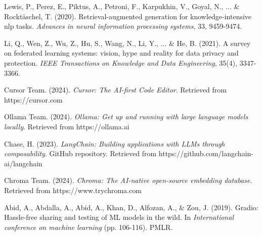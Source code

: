\documentclass[12pt,letterpaper]{article}
\begin{document}
\begin{thebibliography}{99}

Lewis, P., Perez, E., Piktus, A., Petroni, F., Karpukhin, V., Goyal, N., ... \& Rockt\"{a}schel, T. (2020). Retrieval-augmented generation for knowledge-intensive nlp tasks. \textit{Advances in neural information processing systems}, 33, 9459-9474.

Li, Q., Wen, Z., Wu, Z., Hu, S., Wang, N., Li, Y., ... \& He, B. (2021). A survey on federated learning systems: vision, hype and reality for data privacy and protection. \textit{IEEE Transactions on Knowledge and Data Engineering}, 35(4), 3347-3366.

Cursor Team. (2024). \textit{Cursor: The AI-first Code Editor}. Retrieved from https://cursor.com

Ollama Team. (2024). \textit{Ollama: Get up and running with large language models locally}. Retrieved from https://ollama.ai

Chase, H. (2023). \textit{LangChain: Building applications with LLMs through composability}. GitHub repository. Retrieved from https://github.com/langchain-ai/langchain

Chroma Team. (2024). \textit{Chroma: The AI-native open-source embedding database}. Retrieved from https://www.trychroma.com

Abid, A., Abdalla, A., Abid, A., Khan, D., Alfozan, A., \& Zou, J. (2019). Gradio: Hassle-free sharing and testing of ML models in the wild. In \textit{International conference on machine learning} (pp. 106-116). PMLR.

\end{thebibliography}
\end{document}
